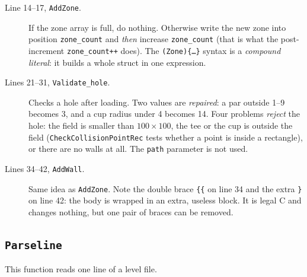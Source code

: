 \documentclass[11pt,a4paper]{article}
\newcommand{\code}[3]{}
\begin{document}
\begin{description}
  \item[Line 14--17, \texttt{AddZone}.] If the zone array is full, do nothing. Otherwise write the new zone into
  position \texttt{zone\_count} and \emph{then} increase \texttt{zone\_count} (that is what the post-increment
  \texttt{zone\_count++} does). The \texttt{(Zone)\{\dots\}} syntax is a \emph{compound literal}: it builds a whole
  struct in one expression.
  \item[Lines 21--31, \texttt{Validate\_hole}.] Checks a hole after loading. Two values are \emph{repaired}: a par
  outside 1--9 becomes 3, and a cup radius under 4 becomes 14. Four problems \emph{reject} the hole: the field is
  smaller than $100\times100$, the tee or the cup is outside the field (\texttt{CheckCollisionPointRec} tests whether a
  point is inside a rectangle), or there are no walls at all. The \texttt{path} parameter is not used.
  \item[Lines 34--42, \texttt{AddWall}.] Same idea as \texttt{AddZone}. Note the double brace \texttt{\{\{} on line 34
  and the extra \texttt{\}} on line 42: the body is wrapped in an extra, useless block. It is legal C and changes
  nothing, but one pair of braces can be removed.
\end{description}

\subsection{\texttt{Parseline}}

\code{level.c}{44}{86}

This function reads one line of a level file.
\end{document}
